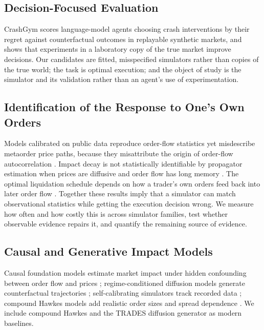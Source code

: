 \documentclass{ieeeaccess}
\begin{document}
\subsection{Decision-Focused Evaluation}
CrashGym \cite{lu2026crashgym} scores language-model agents choosing crash interventions by their regret against
counterfactual outcomes in replayable synthetic markets, and shows that experiments in a laboratory copy of the true
market improve decisions. Our candidates are fitted, misspecified simulators rather than copies of the true world; the
task is optimal execution; and the object of study is the simulator and its validation rather than an agent's use of
experimentation.

\subsection{Identification of the Response to One's Own Orders}
Models calibrated on public data reproduce order-flow statistics yet misdescribe metaorder price paths, because they
misattribute the origin of order-flow autocorrelation \cite{naviglio2026metaorder}. Impact decay is not statistically
identifiable by propagator estimation when prices are diffusive and order flow has long memory
\cite{fujiwara2026decay}. The optimal liquidation schedule depends on how a trader's own orders feed back into later
order flow \cite{chen2025endogenous}. Together these results imply that a simulator can match observational statistics
while getting the execution decision wrong. We measure how often and how costly this is across simulator families, test
whether observable evidence repairs it, and quantify the remaining source of evidence.

\subsection{Causal and Generative Impact Models}
Causal foundation models estimate market impact under hidden confounding between order flow and prices
\cite{thumm2026causal}; regime-conditioned diffusion models generate counterfactual trajectories
\cite{wang2026difflob}; self-calibrating simulators track recorded data \cite{zhong2026evomarket}; compound Hawkes models
add realistic order sizes and spread dependence \cite{jain2024compound}. We include compound Hawkes and the TRADES
diffusion generator \cite{berti2025trades} as modern baselines.
\end{document}
